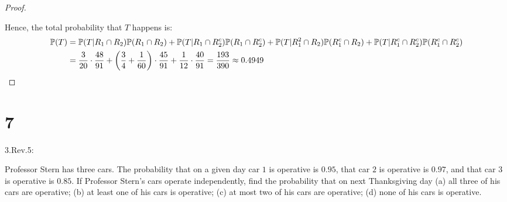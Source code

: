 \documentclass{article}
\begin{document}
\begin{proof}
\begin{itemize}
    \end{itemize}
    Hence, the total probability that $T$ happens is:
    \begin{align}
        \mathbb{P}(T)&=\mathbb{P}(T|R_1\cap R_2)\mathbb{P}(R_1\cap R_2)+\mathbb{P}(T|R_1\cap R_2^c)\mathbb{P}(R_1\cap R_2^c)+\mathbb{P}(T|R_1^2\cap R_2)\mathbb{P}(R_1^c\cap R_2)+\mathbb{P}(T|R_1^c\cap R_2^c)\mathbb{P}(R_1^c\cap R_2^c)\\
        &= \frac{3}{20}\cdot\frac{48}{91}+\left(\frac{3}{4}+\frac{1}{60}\right)\cdot\frac{45}{91}+\frac{1}{12}\cdot\frac{40}{91} = \frac{193}{390}\approx 0.4949
    \end{align}
\end{proof}

\newpage
\section*{7}
\begin{ques}\label{q7}
    3.Rev.5:

    Professor Stern has three cars. The probability that on a given day car $1$ is operative is $0.95$, that car $2$ is operative is $0.97$, and that car $3$ is operative is $0.85$. If Professor Stern's cars operate independently, find the probability that on next Thanksgiving day (a) all three of his cars are operative; (b) at least one of his cars is operative; (c) at most two of his cars are operative; (d) none of his cars is operative.
\end{ques}
\end{document}
